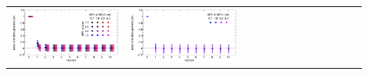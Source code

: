 \documentclass[compress]{beamer}
\begin{document}
\begin{frame}
\begin{tabular}{p{0.3\linewidth} p{0.3\linewidth} p{0.3\linewidth}}
\includegraphics[width=\linewidth]{me32_meanstdev.png} & 
\includegraphics[width=\linewidth]{me41_meanstdev.png}
\end{tabular}
\end{frame}
\end{document}
